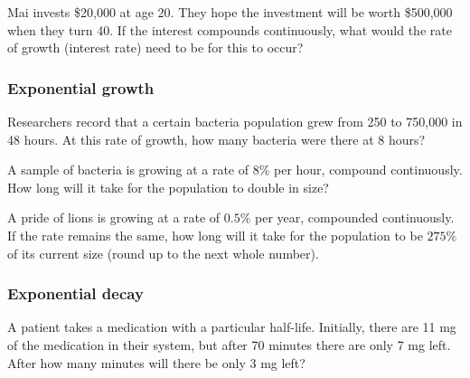 \begin{exercise}
Mai invests \$20,000 at age 20. They hope the investment will be worth \$500,000 when they turn 40.
If the interest compounds continuously, what would the rate of growth (interest rate) need to be for
this to occur?
\end{exercise}
\begin{solution}[3.5in]

\end{solution}

\subsubsection*{Exponential growth}

\begin{exercise}
Researchers record that a certain bacteria population grew from 250 to 750,000 in 48 hours. At this rate of growth, how many bacteria were there at 8 hours?
\end{exercise}
\begin{solution}[3.5in]

\end{solution}

\begin{exercise}
A sample of bacteria is growing at a rate of 8\% per hour, compound continuously. How long
will it take for the population to double in size?
\end{exercise}
\begin{solution}[4in]

\end{solution}

\begin{exercise}
A pride of lions is growing at a rate of $0.5\%$ per year, compounded continuously. If the rate remains the same, how long will it take for the population to be $275\%$ of its current size (round up to the next whole number).
\end{exercise}
\begin{solution}[3.5in]

\end{solution}

\subsubsection*{Exponential decay}

\begin{exercise}
A patient takes a medication with a particular half-life. Initially, there are 11 mg of the medication
in their system, but after 70 minutes there are only 7 mg left. After how many minutes will there be
only 3 mg left?
\end{exercise}
\begin{solution}[4in]

\end{solution}

